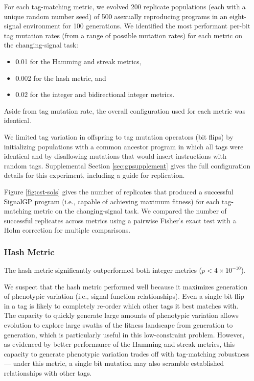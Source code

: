 For each tag-matching metric, we evolved 200 replicate populations (each with a unique random number seed) of 500 asexually reproducing programs in an eight-signal environment for 100 generations.
We identified the most performant per-bit tag mutation rates (from a range of possible mutation rates) for each metric on the changing-signal task:
\begin{itemize}
    \item 0.01 for the Hamming and streak metrics,
    \item 0.002 for the hash metric, and
    \item 0.02 for the integer and bidirectional integer metrics.
\end{itemize}
Aside from tag mutation rate, the overall configuration used for each metric was identical.

We limited tag variation in offspring to tag mutation operators (bit flips) by initializing populations with a common ancestor program in which all tags were identical and by disallowing mutations that would insert instructions with random tags.
Supplemental Section \ref{sec:gpsupplement} gives the full configuration details for this experiment, including a guide for replication.

% 

Figure \ref{fig:cst-sols} gives the number of replicates that produced a successful SignalGP program (i.e., capable of achieving maximum fitness) for each tag-matching metric on the changing-signal task.
We compared the number of successful replicates across metrics using a pairwise Fisher's exact test with a Holm correction for multiple comparisons.

\subsubsection{Hash Metric}

The hash metric significantly outperformed both integer metrics ($p < 4\times10^{-10}$).

We suspect that the hash metric performed well because it maximizes generation of phenotypic variation (i.e., signal-function relationships).
Even a single bit flip in a tag is likely to completely re-order which other tags it best matches with.
The capacity to quickly generate large amounts of phenotypic variation allows evolution to explore large swaths of the fitness landscape from generation to generation, which is particularly useful in this low-constraint problem.
However, as evidenced by better performance of the Hamming and streak metrics, this capacity to generate phenotypic variation trades off with tag-matching robustness --- under this metric, a single bit mutation may also scramble established relationships with other tags.

